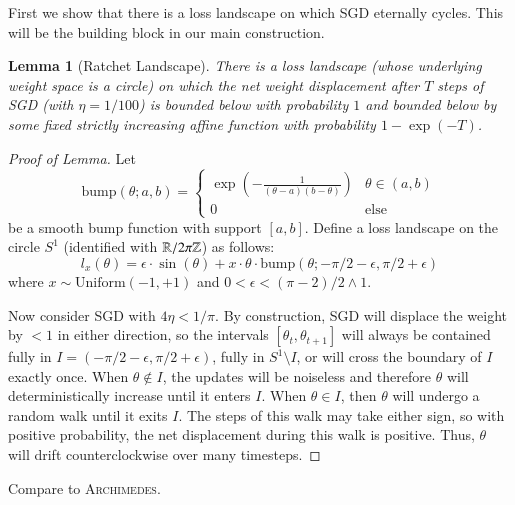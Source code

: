 \documentclass[openany, notitlepage, justified]{tufte-book}
\theoremstyle{plain}
\newtheorem{lem}{Lemma}
\theoremstyle{definition}
\newcommand{\wrap}[1]{\left(#1\right)}
\newcommand{\Archimedes}{\textsc{Archimedes}}
\begin{document}
        First we show that there is a loss landscape on which SGD eternally
        cycles.  This will be the building block in our main construction.
        \begin{lem}[Ratchet Landscape]
            There is a loss landscape (whose underlying weight space is a
            circle) on which the net weight displacement after $T$ steps of
            SGD (with $\eta=1/100$) is bounded below with
            probability $1$ and bounded below by some fixed strictly increasing
            affine function with probability $1-\exp(-T)$. 
        \end{lem}
        \begin{proof}[Proof of Lemma]
            Let
            $$
                \text{bump}(\theta;a,b) = \begin{cases}
                    \exp\wrap{-\frac{1}{(\theta-a)(b-\theta)}}  &   \theta\in(a,b) \\
                    0                                           &   \text{else}
                \end{cases}
            $$
            be a smooth bump function with support $[a,b]$.
            Define a loss landscape on the circle $S^1$ (identified with $\mathbb{R}/2\pi \mathbb{Z}$)
            as follows: 
            $$
                l_x(\theta) = \epsilon \cdot \sin(\theta) +
                              x \cdot \theta \cdot \text{bump}(\theta;-\pi/2-\epsilon,\pi/2+\epsilon)
            $$
            where $x\sim \text{Uniform}(-1, +1)$ and
            $0<\epsilon<(\pi-2)/2\wedge 1$.

            Now consider SGD with $4\eta<1/\pi$.
            By construction, SGD will displace
            the weight by $<1$ in either direction, so the intervals
            $[\theta_t, \theta_{t+1}]$ will always be contained fully in $I =
            (-\pi/2-\epsilon,\pi/2+\epsilon)$, fully in $S^1\setminus I$, or
            will cross the boundary of $I$ exactly once.
            When $\theta\notin I$, the updates will be noiseless and therefore
            $\theta$ will deterministically increase until it enters $I$.
            When $\theta\in I$, then $\theta$ will undergo a random walk until it
            exits $I$.  The steps of this walk may take either sign, so with
            positive probability, the net displacement during this walk is
            positive.
            Thus, $\theta$ will drift counterclockwise over many timesteps. 
        \end{proof}
        {\color{red}
        Compare to \Archimedes.
        }
\end{document}

